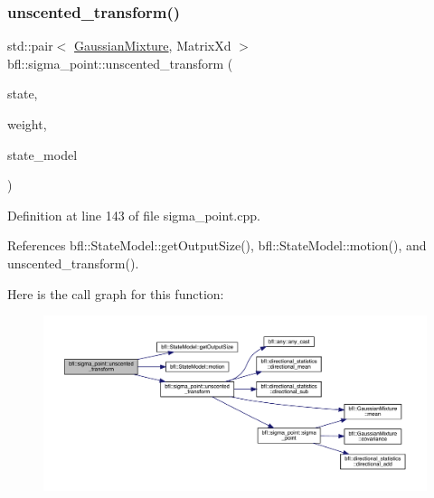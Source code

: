 \subsubsection{\texorpdfstring{unscented\+\_\+transform()}{unscented\_transform()}\hspace{0.1cm}{\footnotesize\ttfamily [2/8]}}
{\footnotesize\ttfamily std\+::pair$<$ \mbox{\hyperlink{classbfl_1_1GaussianMixture}{Gaussian\+Mixture}}, Matrix\+Xd $>$ bfl\+::sigma\+\_\+point\+::unscented\+\_\+transform (\begin{DoxyParamCaption}\item[{const \mbox{\hyperlink{classbfl_1_1GaussianMixture}{Gaussian\+Mixture}} \&}]{state,  }\item[{const \mbox{\hyperlink{structbfl_1_1sigma__point_1_1UTWeight}{U\+T\+Weight}} \&}]{weight,  }\item[{\mbox{\hyperlink{classbfl_1_1StateModel}{State\+Model}} \&}]{state\+\_\+model }\end{DoxyParamCaption})}



Definition at line 143 of file sigma\+\_\+point.\+cpp.



References bfl\+::\+State\+Model\+::get\+Output\+Size(), bfl\+::\+State\+Model\+::motion(), and unscented\+\_\+transform().

Here is the call graph for this function\+:
\nopagebreak
\begin{figure}[H]
\begin{center}
\leavevmode
\includegraphics[width=350pt]{namespacebfl_1_1sigma__point_a49b40777ee901dfbe3752e8f165fb439_cgraph}
\end{center}
\end{figure}
\mbox{\label{namespacebfl_1_1sigma__point_a9b4d661460ac0ad28493ae144a6ccee4}} 
